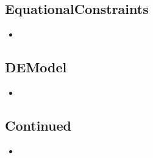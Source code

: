 \subsection{EquationalConstraints}

\begin{itemize}

    \item {}

\end{itemize}

\subsection{DEModel}

\begin{itemize}

    \item {}

\end{itemize}

\subsection{Continued}

\begin{itemize}

    \item {}

\end{itemize}
